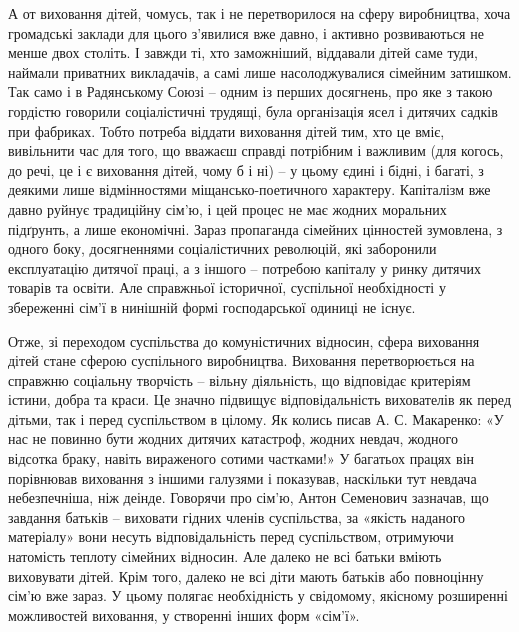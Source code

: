 \documentclass[../main]{subfiles}
\begin{document}
А от виховання дітей, чомусь, так і не перетворилося на сферу виробництва, хоча громадські заклади для цього з’явилися вже давно, і активно розвиваються не менше двох століть. І завжди ті, хто заможніший, віддавали дітей саме туди, наймали приватних викладачів, а самі лише насолоджувалися сімейним затишком. Так само і в Радянському Союзі – одним із перших досягнень, про яке з такою гордістю говорили соціалістичні трудящі, була організація ясел і дитячих садків при фабриках. Тобто потреба віддати виховання дітей тим, хто це вміє, вивільнити час для того, що вважаєш справді потрібним і важливим (для когось, до речі, це і є виховання дітей, чому б і ні) – у цьому єдині і бідні, і багаті, з деякими лише відмінностями міщансько-поетичного характеру. Капіталізм вже давно руйнує традиційну сім’ю, і цей процес не має жодних моральних підґрунть, а лише економічні. Зараз пропаганда сімейних цінностей зумовлена, з одного боку, досягненнями соціалістичних революцій, які заборонили експлуатацію дитячої праці, а з іншого – потребою капіталу у ринку дитячих товарів та освіти. Але справжньої історичної, суспільної необхідності у збереженні сім’ї в нинішній формі господарської одиниці не існує.

Отже, зі переходом суспільства до комуністичних відносин, сфера виховання дітей стане сферою суспільного виробництва. Виховання перетворюється на справжню соціальну творчість – вільну діяльність, що відповідає критеріям істини, добра та краси. Це значно підвищує відповідальність вихователів як перед дітьми, так і перед суспільством в цілому. Як колись писав А. С. Макаренко: «У нас не повинно бути жодних дитячих катастроф, жодних невдач, жодного відсотка браку, навіть вираженого сотими частками!» У багатьох працях він порівнював виховання з іншими галузями і показував, наскільки тут невдача небезпечніша, ніж деінде. Говорячи про сім’ю, Антон Семенович зазначав, що завдання батьків – виховати гідних членів суспільства, за «якість наданого матеріалу» вони несуть відповідальність перед суспільством, отримуючи натомість теплоту сімейних відносин. Але далеко не всі батьки вміють виховувати дітей. Крім того, далеко не всі діти мають батьків або повноцінну сім’ю вже зараз. У цьому полягає необхідність у свідомому, якісному розширенні можливостей виховання, у створенні інших форм «сім’ї».
\end{document}
